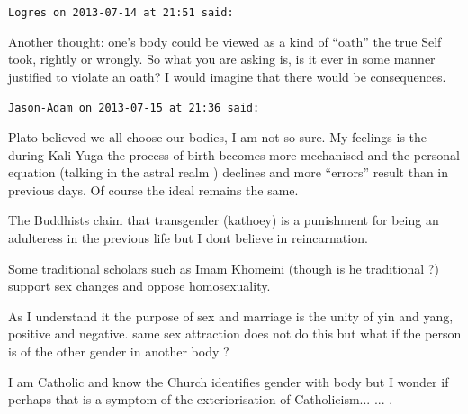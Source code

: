 \begin{footnotesize}
\begin{sffamily}
\hfill

\texttt{Logres on 2013-07-14 at 21:51 said:}

Another thought: one's body could be viewed as a kind of ``oath'' the true Self took, rightly or wrongly. So what you are asking is, is it ever in some manner justified to violate an oath? I would imagine that there would be consequences.

\hfill

\texttt{Jason-Adam on 2013-07-15 at 21:36 said:}

Plato believed we all choose our bodies, I am not so sure. My feelings is the during Kali Yuga the process of birth becomes more mechanised and the personal equation (talking in the astral realm ) declines and more ``errors'' result than in previous days. Of course the ideal remains the same.

The Buddhists claim that transgender (kathoey) is a punishment for being an adulteress in the previous life but I dont believe in reincarnation.

Some traditional scholars such as Imam Khomeini (though is he traditional ?) support sex changes and oppose homosexuality.

As I understand it the purpose of sex and marriage is the unity of yin and yang, positive and negative. same sex attraction does not do this but what if the person is of the other gender in another body ?

I am Catholic and know the Church identifies gender with body but I wonder if perhaps that is a symptom of the exteriorisation of Catholicism... ... .


\hfill

\end{sffamily}
\end{footnotesize}

